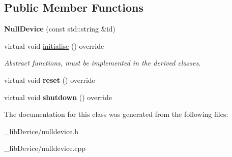 \subsection*{Public Member Functions}
\begin{DoxyCompactItemize}
\item 
{\bfseries Null\+Device} (const std\+::string \&id)\hypertarget{class_null_device_a0b5e08d3de90b7e61b58a1a417506749}{}\label{class_null_device_a0b5e08d3de90b7e61b58a1a417506749}

\item 
virtual void \hyperlink{class_null_device_a1852663d61619d037dc02d8a657ceb80}{initialise} () override\hypertarget{class_null_device_a1852663d61619d037dc02d8a657ceb80}{}\label{class_null_device_a1852663d61619d037dc02d8a657ceb80}

\begin{DoxyCompactList}\small\item\em Abstract functions, must be implemented in the derived classes. \end{DoxyCompactList}\item 
virtual void {\bfseries reset} () override\hypertarget{class_null_device_a20b19d5c07f540766311bf5e21cee927}{}\label{class_null_device_a20b19d5c07f540766311bf5e21cee927}

\item 
virtual void {\bfseries shutdown} () override\hypertarget{class_null_device_a414a0c887b1edb54fa085d4ad2c50def}{}\label{class_null_device_a414a0c887b1edb54fa085d4ad2c50def}

\end{DoxyCompactItemize}


The documentation for this class was generated from the following files\+:\begin{DoxyCompactItemize}
\item 
\+\_\+lib\+Device/nulldevice.\+h\item 
\+\_\+lib\+Device/nulldevice.\+cpp\end{DoxyCompactItemize}
